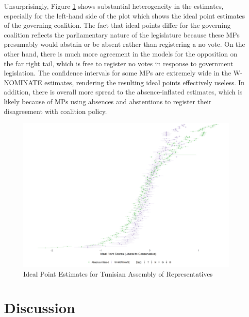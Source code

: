 	Unsurprisingly, Figure \ref{tunis_ideal} shows substantial heterogeneity in the estimates, especially for the left-hand side of the plot which shows the ideal point estimates of the governing coalition. The fact that ideal points differ for the governing coalition reflects the parliamentary nature of the legislature because these MPs presumably would abstain or be absent rather than registering a no vote. On the other hand, there is much more agreement in the models for the opposition on the far right tail, which is free to register no votes in response to government legislation. The confidence intervals for some MPs are extremely wide in the W-NOMINATE estimates, rendering the resulting ideal points effectively useless. In addition, there is overall more spread to the absence-inflated estimates, which is likely because of MPs using absences and abstentions to register their disagreement with coalition policy.
	
	
	\begin{figure}
		\centering
		\caption{Ideal Point Estimates for Tunisian Assembly of Representatives}\label{tunis_ideal}
		\includegraphics[width=\linewidth]{tunisia_arp_compare}
	\end{figure}
	
	\section*{Discussion}
	
